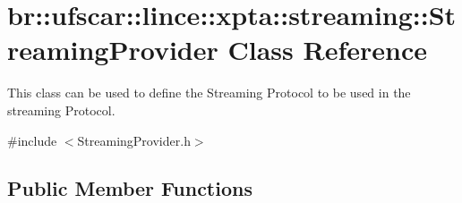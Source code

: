 \hypertarget{classbr_1_1ufscar_1_1lince_1_1xpta_1_1streaming_1_1StreamingProvider}{
\section{br::ufscar::lince::xpta::streaming::StreamingProvider Class Reference}
\label{classbr_1_1ufscar_1_1lince_1_1xpta_1_1streaming_1_1StreamingProvider}
}


This class can be used to define the Streaming Protocol to be used in the streaming Protocol.  




{\ttfamily \#include $<$StreamingProvider.h$>$}

\subsection*{Public Member Functions}
